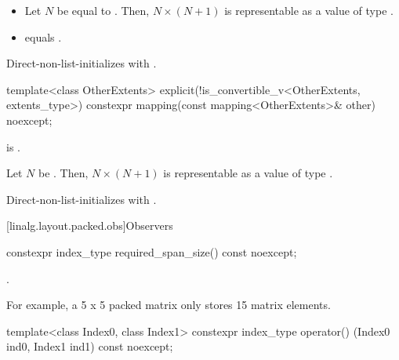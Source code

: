 \begin{itemdescr}
\pnum
\expects
\begin{itemize}
\item
Let $N$ be equal to .
Then, $N \times (N+1)$ is representable as
a value of type .
\item
{} equals .
\end{itemize}

\pnum
\effects
Direct-non-list-initializes  with .
\end{itemdescr}

%
\begin{itemdecl}
template<class OtherExtents>
  explicit(!is_convertible_v<OtherExtents, extents_type>)
    constexpr mapping(const mapping<OtherExtents>& other) noexcept;
\end{itemdecl}

\begin{itemdescr}
\pnum
\constraints
{} is .

\pnum
\expects
Let $N$ be .
Then, $N \times (N+1)$ is representable as
a value of type .

\pnum
\effects
Direct-non-list-initializes  with .
\end{itemdescr}

[linalg.layout.packed.obs]{Observers}

%
\begin{itemdecl}
constexpr index_type required_span_size() const noexcept;
\end{itemdecl}

\begin{itemdescr}
\pnum
\returns
{}.
\begin{note}
For example, a 5 x 5 packed matrix
only stores 15 matrix elements.
\end{note}
\end{itemdescr}

%
\begin{itemdecl}
template<class Index0, class Index1>
  constexpr index_type operator() (Index0 ind0, Index1 ind1) const noexcept;
\end{itemdecl}

